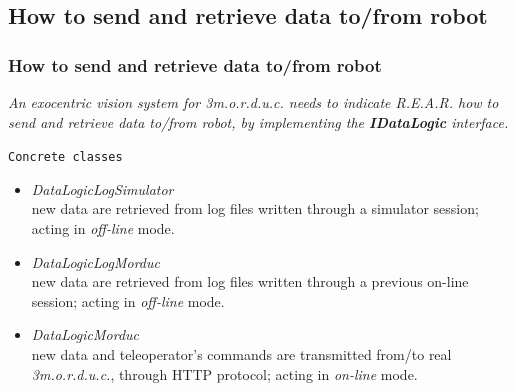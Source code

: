 \subsection{How to send and retrieve data to/from robot}
\frame
{
  \frametitle{How to send and retrieve data to/from robot}
  
  \emph{An exocentric vision system for \textit{3m.o.r.d.u.c.} 
    needs to indicate \textit{R.E.A.R.} how to send and retrieve data to/from robot,
    by implementing the \textbf{IDataLogic} interface.}
  \pause

  \begin{block} {\alert{\texttt{Concrete classes}}}

    \begin{itemize}
      
    \pause
    \item \alert{\textit{DataLogicLogSimulator}} \\
      \footnotesize{
        new data are retrieved from log files written through
        a simulator session; acting
        in \textit{off-line} mode.
        }
    \pause
    \item \alert{\textit{DataLogicLogMorduc}} \\
      \footnotesize{
        new data are retrieved from log files written through
        a previous on-line session; acting
        in \textit{off-line} mode.
      }
    \pause
    \item \alert{\textit{DataLogicMorduc}} \\
      \footnotesize{
        new data and teleoperator's commands are transmitted from/to real 
        \textit{3m.o.r.d.u.c.}, through HTTP protocol; acting in
        \textit{on-line} mode.
      }
    \end{itemize}

  \end{block}
}


